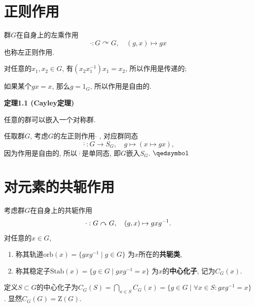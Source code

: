 \documentclass[UTF8]{ctexart}
\begin{document}
\setlength{\abovedisplayskip}{1pt}
\setlength{\belowdisplayskip}{1pt}

\section{正则作用}

群$G$在自身上的左乘作用
\[
    \cdot:G\curvearrowright G,\quad(g,x)\mapsto gx
\]
也称左正则作用.

对任意的$x_1,x_2\in G$, 有$(x_2x_1^{-1})x_1=x_2$, 所以作用是传递的;

如果某个$gx=x$, 那么$g=1_G$, 所以作用是自由的.

\vspace{10pt}

\hypertarget{sec:定理1.1}{}
\noindent\textbf{定理1.1 (Cayley定理)}

任意的群可以嵌入一个对称群.


任取群$G$, 考虑$G$的左正则作用$\cdot$ , 对应群同态
\[
    \overline{\cdot}:G\to S_G,\quad g\mapsto(x\mapsto gx),
\]
因为作用是自由的, 所以$\overline{\cdot}$是单同态, 即$G$嵌入$S_G$.
\hfill $\qedsymbol$





\vspace{20pt}

\section{对元素的共轭作用}

考虑群$G$在自身上的共轭作用
\[
    \cdot:G\curvearrowright G,\quad(g,x)\mapsto gxg^{-1}.\\[-3pt]
\]
对任意的$x\in G$,
\begin{enumerate}
    \item 称其轨道$\mathrm{orb}(x)=\{gxg^{-1}\mid g\in G\}$
    为$x$所在的\textbf{共轭类},
    \item 称其稳定子$\mathrm{Stab}(x)=\{g\in G\mid gxg^{-1}=x\}$
    为$x$的\textbf{中心化子}, 记为$C_G(x)$.
\end{enumerate}

\vspace{10pt}

定义$S\subset G$的中心化子为$\displaystyle C_G(S)=
\bigcap_{x\in S}C_G(x)=\{g\in G\mid\forall x\in S:gxg^{-1}=x\}$.
显然$C_G(G)=\mathrm{Z}(G)$.

\vspace{10pt}
\end{document}
